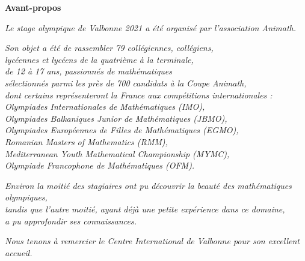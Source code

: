 \begin{flushright}

\textbf{\Large{Avant-propos}}

\bigskip

\emph{Le stage olympique de Valbonne 2021 a été organisé par l'association Animath.}

\bigskip

\emph{Son objet a été de rassembler 79 collégiennes, collégiens,\\
lycéennes et lycéens de la quatrième à la terminale, \\
de 12 à 17 ans, passionnés de mathématiques \\
sélectionnés parmi les près de 700 candidats à la Coupe Animath, \\
dont certains représenteront la France aux compétitions internationales : \\
Olympiades Internationales de Mathématiques (IMO), \\
Olympiades Balkaniques Junior de Mathématiques (JBMO), \\
Olympiades Européennes de Filles de Mathématiques (EGMO), \\
Romanian Masters of Mathematics (RMM), \\
Mediterranean Youth Mathematical Championship (MYMC), \\
Olympiade Francophone de Mathématiques (OFM).}

\bigskip

\emph{
Environ la moitié des stagiaires ont pu découvrir la beauté des mathématiques olympiques,\\
tandis que l'autre moitié, ayant déjà une petite expérience dans ce domaine,\\
a pu approfondir ses connaissances.\\
}

\vspace{3cm}

\emph{Nous tenons à remercier le Centre International de Valbonne pour son excellent accueil.}
\end{flushright}




\pagebreak

\mbox { }

\pagebreak


